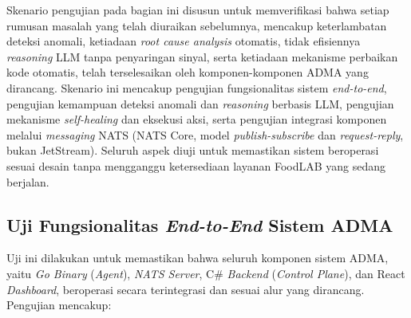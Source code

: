 Skenario pengujian pada bagian ini disusun untuk memverifikasi bahwa setiap rumusan masalah yang telah diuraikan sebelumnya, mencakup keterlambatan deteksi anomali, ketiadaan \textit{root cause analysis} otomatis, tidak efisiennya \textit{reasoning} LLM tanpa penyaringan sinyal, serta ketiadaan mekanisme perbaikan kode otomatis, telah terselesaikan oleh komponen-komponen ADMA yang dirancang. Skenario ini mencakup pengujian fungsionalitas sistem \textit{end-to-end}, pengujian kemampuan deteksi anomali dan \textit{reasoning} berbasis LLM, pengujian mekanisme \textit{self-healing} dan eksekusi aksi, serta pengujian integrasi komponen melalui \textit{messaging} NATS (NATS Core, model \textit{publish-subscribe} dan \textit{request-reply}, bukan JetStream). Seluruh aspek diuji untuk memastikan sistem beroperasi sesuai desain tanpa mengganggu ketersediaan layanan FoodLAB yang sedang berjalan.

\subsection{Uji Fungsionalitas \textit{End-to-End} Sistem ADMA}

Uji ini dilakukan untuk memastikan bahwa seluruh komponen sistem ADMA, yaitu \textit{Go Binary} (\textit{Agent}), \textit{NATS Server}, C\# \textit{Backend} (\textit{Control Plane}), dan React \textit{Dashboard}, beroperasi secara terintegrasi dan sesuai alur yang dirancang. Pengujian mencakup:

